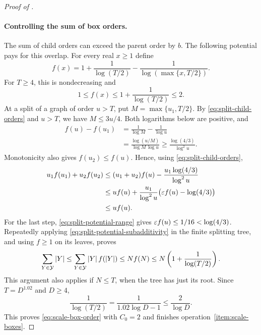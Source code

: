 \begin{proof}[Proof of ]
\paragraph{Controlling the sum of box orders.}
The sum of child orders can exceed the parent order by $b$.  The
following potential pays for this overlap.  For every real $x\ge1$
define
\begin{equation}\label{eq:split-potential}
  f(x)=1+\frac1{\log(T/2)}
         -\frac1{\log(\max\{x,T/2\})}.
\end{equation}
For $T\ge4$, this is nondecreasing and
\begin{equation}\label{eq:split-potential-range}
  1\le f(x)\le1+\frac1{\log(T/2)}\le2.
\end{equation}
At a split of a graph of order $u>T$, put
$M=\max\{u_1,T/2\}$.  By \eqref{eq:split-child-orders} and $u>T$,
we have $M\le3u/4$.  Both logarithms below are positive, and
\begin{equation}\label{eq:split-potential-decrement}
\begin{aligned}
  f(u)-f(u_1)
    &=\frac1{\log M}-\frac1{\log u}\\
    &=\frac{\log(u/M)}{\log M\,\log u}
      \ge\frac{\log(4/3)}{\log^2u}.
\end{aligned}
\end{equation}
Monotonicity also gives $f(u_2)\le f(u)$.  Hence, using
\eqref{eq:split-child-orders},
\begin{equation}\label{eq:split-potential-subadditivity}
\begin{aligned}
  u_1f(u_1)+u_2f(u_2)
    &\le (u_1+u_2)f(u)
         -\frac{u_1\log(4/3)}{\log^2u}\\
    &\le uf(u)
         +\frac{u_1}{\log^2u}
                 \bigl(\varepsilon f(u)-\log(4/3)\bigr)\\
    &\le uf(u).
\end{aligned}
\end{equation}
For the last step, \eqref{eq:split-potential-range} gives
$\varepsilon f(u)\le1/16<\log(4/3)$.  Repeatedly applying
\eqref{eq:split-potential-subadditivity} in the finite splitting tree,
and using $f\ge1$ on its leaves, proves
\[
  \sum_{Y\in\mathcal Y}\left|Y\right|
    \le\sum_{Y\in\mathcal Y}\left|Y\right| f(\left|Y\right|)
    \le Nf(N)
    \le N\left(1+\frac1{\log(T/2)}\right).
\]
This argument also applies if $N\le T$, when the tree has just its
root.  Since $T=D^{1.02}$ and $D\ge4$,
\[
  \frac1{\log(T/2)}
    =\frac1{1.02\log D-1}\le\frac2{\log D}.
\]
This proves \eqref{eq:scale-box-order} with $C_0=2$ and finishes
operation~\ref{item:scale-boxes}.


\end{proof}
